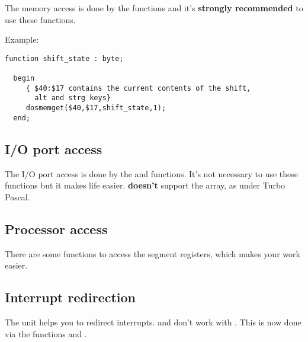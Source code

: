 The \dos memory access is done by the 
functions and it's \textbf {strongly recommended } to use these functions. 

Example:
\begin{verbatim} 
function shift_state : byte;
  
  begin
     { $40:$17 contains the current contents of the shift, 
       alt and strg keys} 
     dosmemget($40,$17,shift_state,1);
  end;
\end{verbatim}
\subsection{I/O port access}

The I/O port access is done by the  and  functions. 
It's not necessary to use these functions but it makes life easier. \fpc 
\textbf {doesn't} support the  array, as under Turbo Pascal. 

\subsection{Processor access}
There are some functions to access the segment registers, which makes
your work easier. 

\subsection{Interrupt redirection}

The  unit helps you to redirect interrupts. 
and  don't work with \fpc. This is now done via the functions
 and .

